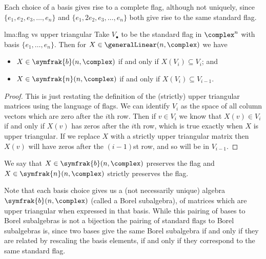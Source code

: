 \documentclass[fleqn]{NotesClass}
\newcommand{\borelLie}{\symfrak{b}}
\newcommand{\nilpotentLie}{\symfrak{n}}
\begin{document}
    Each choice of a basis gives rise to a complete flag, although not uniquely, since \(\{e_1, e_2, e_3, \dotsc, e_n\}\) and \(\{e_1, 2e_2, e_3, \dotsc, e_n\}\) both give rise to the same standard flag.
    
    \begin{lma}{}{lma:flag vs upper triangular}
        Take \(V_{\bullet}\) to be the standard flag in \(\complex^n\) with basis \(\{e_1, \dotsc, e_n\}\).
        Then for \(X \in \generalLinear(n, \complex)\) we have
        \begin{itemize}
            \item \(X \in \borelLie(n, \complex)\) if and only if \(X(V_i) \subseteq V_i\); and
            \item \(X \in \nilpotentLie(n, \complex)\) if and only if \(X(V_i) \subseteq V_{i-1}\).
        \end{itemize}
        \begin{proof}
            This is just restating the definition of the (strictly) upper triangular matrices using the language of flags.
            We can identify \(V_i\) as the space of all column vectors which are zero after the \(i\)th row.
            Then if \(v \in V_i\) we know that \(X(v) \in V_i\) if and only if \(X(v)\) has zeros after the \(i\)th row, which is true exactly when \(X\) is upper triangular.
            If we replace \(X\) with a strictly upper triangular matrix then \(X(v)\) will have zeros after the \((i - 1)\)st row, and so will be in \(V_{i-1}\).
        \end{proof}
    \end{lma}
    
    We say that \(X \in \borelLie(n, \complex)\) preserves the flag and \(X \in \nilpotentLie(n, \complex)\) strictly preserves the flag.
    
    Note that each basis choice gives us a (not necessarily unique) algebra \(\borelLie(n, \complex)\) (called a Borel subalgebra), of matrices which are upper triangular when expressed in that basis.
    While this pairing of bases to Borel subalgebras is not a bijection the pairing of standard flags to Borel subalgebras is, since two bases give the same Borel subalgebra if and only if they are related by rescaling the basis elements, if and only if they correspond to the same standard flag.
    
\end{document}
